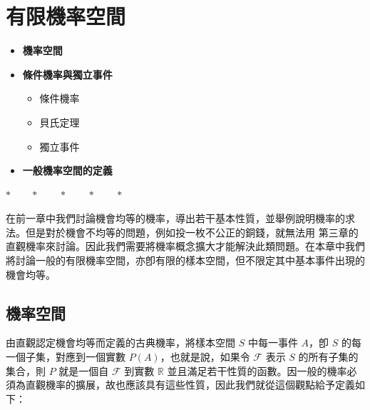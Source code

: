 \section{有限機率空間}\label{sec:b5s-ch4}

\begin{center}
\begin{minipage}{0.75\textwidth}
\begin{itemize}[leftmargin=2em, itemsep=0.3em]
  \item[§ IV-1] \textbf{機率空間}
  \item[§ IV-2] \textbf{條件機率與獨立事件}
  \begin{itemize}[leftmargin=1.5em, itemsep=0.2em]
    \item[甲、] 條件機率
    \item[乙、] 貝氏定理
    \item[丙、] 獨立事件
  \end{itemize}
  \item[附錄] \textbf{一般機率空間的定義}
\end{itemize}
\end{minipage}
\end{center}

\begin{center}
$* \qquad * \qquad * \qquad * \qquad *$
\end{center}

在前一章中我們討論機會均等的機率，導出若干基本性質，並舉例說明機率的求法。但是對於機會不均等的問題，例如投一枚不公正的銅錢，就無法用 第三章的直觀機率來討論。因此我們需要將機率概念擴大才能解決此類問題。在本章中我們將討論一般的有限機率空間，亦卽有限的樣本空間，但不限定其中基本事件出現的機會均等。

\subsection{機率空間}\label{sec:b5s-4-1}
\setcounter{equation}{0}

由直觀認定機會均等而定義的古典機率，將樣本空間 $S$ 中每一事件 $A$，卽 $S$ 的每一個子集，對應到一個實數 $P(A)$，也就是說，如果令 $\mathscr{F}$ 表示 $S$ 的所有子集的集合，則 $P$ 就是一個自 $\mathscr{F}$ 到實數 $\mathbb{R}$ 並且滿足若干性質的函數。因一般的機率必須為直觀機率的擴展，故也應該具有這些性質，因此我們就從這個觀點給予定義如下：

